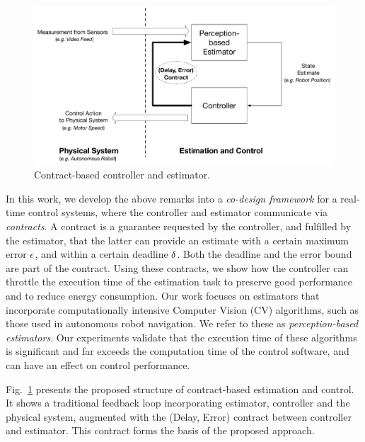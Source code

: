 \begin{figure}[t]
	\centering
	\includegraphics[scale=0.3]{figures/omnigraffle_figures/high_level_figure.pdf}
	\caption{Contract-based controller and estimator.}
	\label{fig:codesignedCE}
\end{figure}



In this work, we develop the above remarks into a \emph{co-design framework} for a real-time control systems, where the controller and estimator communicate via \emph{contracts}.
A contract is a guarantee requested by the controller, and fulfilled by the estimator, that the latter can provide an estimate with a certain maximum error $\epsilon$, and within a certain deadline $\delta$.
Both the deadline and the error bound are part of the contract.
Using these contracts, we show how the controller can throttle the execution time of the estimation task to preserve good performance and to reduce energy consumption.
Our work focuses on estimators that incorporate computationally intensive Computer Vision (CV) algorithms, such as those used in autonomous robot navigation. 
We refer to these as \emph{perception-based estimators}.
Our experiments validate that the execution time of these algorithms is significant and far exceeds the computation time of the control software, and can have an effect on control performance.

Fig.~\ref{fig:codesignedCE} presents the proposed structure of contract-based estimation and control.
It shows a traditional feedback loop incorporating estimator, controller and the physical system, augmented with the (Delay, Error) contract between controller and estimator.
This contract forms the basis of the proposed approach.

